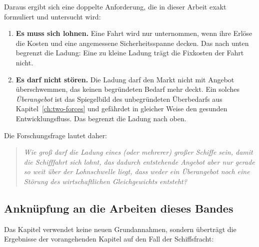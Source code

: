 \documentclass[a4paper, 12pt, twoside, openright]{report}
\theoremstyle{definition}
\theoremstyle{definition}
\begin{document}
Daraus ergibt sich eine doppelte Anforderung, die in dieser Arbeit exakt formuliert und
untersucht wird:

\begin{enumerate}
  \item \textbf{Es muss sich lohnen.} Eine Fahrt wird nur unternommen, wenn ihre
    Erlöse die Kosten und eine angemessene Sicherheitsspanne decken. Das nach unten
    begrenzt die Ladung: Eine zu kleine Ladung trägt die Fixkosten der Fahrt nicht.
  \item \textbf{Es darf nicht stören.} Die Ladung darf den Markt nicht mit
    Angebot überschwemmen, das keinen begründeten Bedarf mehr deckt. Ein solches
    \emph{Überangebot} ist das Spiegelbild des unbegründeten Überbedarfs aus
    Kapitel~\ref{ch:two-forces} und gefährdet in gleicher Weise den gesunden
    Entwicklungsfluss. Das begrenzt die Ladung nach oben.
\end{enumerate}

Die Forschungsfrage lautet daher:

\begin{quote}
\emph{Wie groß darf die Ladung eines (oder mehrerer) großer Schiffe sein, damit die
Schifffahrt sich lohnt, das dadurch entstehende Angebot aber nur gerade so weit über
der Lohnschwelle liegt, dass weder ein Überangebot noch eine Störung des
wirtschaftlichen Gleichgewichts entsteht?}
\end{quote}

\subsection{Anknüpfung an die Arbeiten dieses Bandes}

Das Kapitel verwendet keine neuen Grundannahmen, sondern überträgt die Ergebnisse der
vorangehenden Kapitel auf den Fall der Schiffsfracht:
\end{document}
